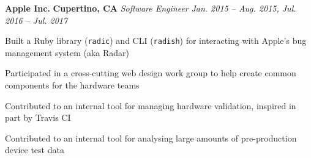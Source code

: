 \item
\headerrow
{\textbf{Apple Inc.}}
{\textbf{Cupertino, CA}}
\headerrow
{\emph{Software Engineer}}
{\emph{Jan. 2015 -- Aug. 2015, Jul. 2016 -- Jul. 2017}}
\begin{itemize*}
    \item Built a Ruby library (\texttt{radic}) and CLI (\texttt{radish}) for
    interacting with Apple's bug management system (aka Radar)
    \item Participated in a cross-cutting web design work group to help create
    common components for the hardware teams
    \item Contributed to an internal tool for managing hardware validation,
    inspired in part by Travis CI
    \item Contributed to an internal tool for analysing large amounts of
    pre-production device test data
\end{itemize*}

